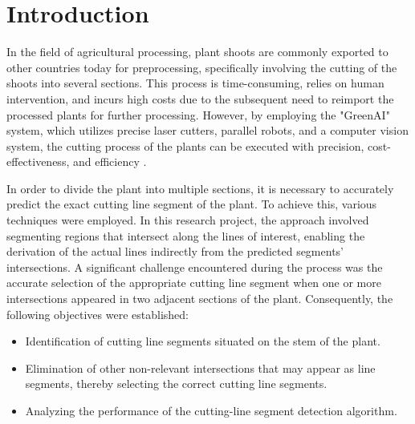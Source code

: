 \documentclass[]{iat}
\begin{document}
	\graphicspath{{./project_graphics/}}


\pagestyle{iat}
\tableofcontents
\chapter{Introduction}
\setcounter{page}{1}
\par
In the field of agricultural processing, plant shoots are commonly exported to other countries today for preprocessing, specifically involving the cutting of the shoots into several sections. This process is time-consuming, relies on human intervention, and incurs high costs due to the subsequent need to reimport the processed plants for further processing. However, by employing the "GreenAI" system, which utilizes precise laser cutters, parallel robots, and a computer vision system, the cutting process of the plants can be executed with precision, cost-effectiveness, and efficiency \cite{greenai}.
\par
In order to divide the plant into multiple sections, it is necessary to accurately predict the exact cutting line segment of the plant. To achieve this, various techniques were employed. In this research project, the approach involved segmenting regions that intersect along the lines of interest, enabling the derivation of the actual lines indirectly from the predicted segments' intersections. A significant challenge encountered during the process was the accurate selection of the appropriate cutting line segment when one or more intersections appeared in two adjacent sections of the plant. Consequently, the following objectives were established:
\par

\begin{itemize}
    \item Identification of cutting line segments situated on the stem of the plant.
    \item Elimination of other non-relevant intersections that may appear as line segments, thereby selecting the correct cutting line segments.
    \item Analyzing the performance of the cutting-line segment detection algorithm.
\end{itemize}
\end{document}
